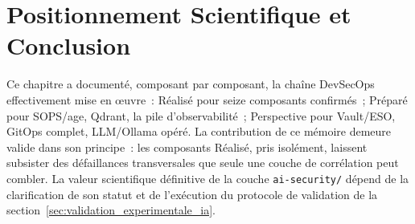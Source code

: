 \section{Positionnement Scientifique et Conclusion}

Ce chapitre a documenté, composant par composant, la chaîne DevSecOps effectivement mise en œuvre~: Réalisé pour seize composants confirmés~; Préparé pour SOPS/age, Qdrant, la pile d'observabilité~; Perspective pour Vault/ESO, GitOps complet, LLM/Ollama opéré. La contribution de ce mémoire demeure valide dans son principe~: les composants Réalisé, pris isolément, laissent subsister des défaillances transversales que seule une couche de corrélation peut combler. La valeur scientifique définitive de la couche \texttt{ai-security/} dépend de la clarification de son statut et de l'exécution du protocole de validation de la section~\ref{sec:validation_experimentale_ia}.